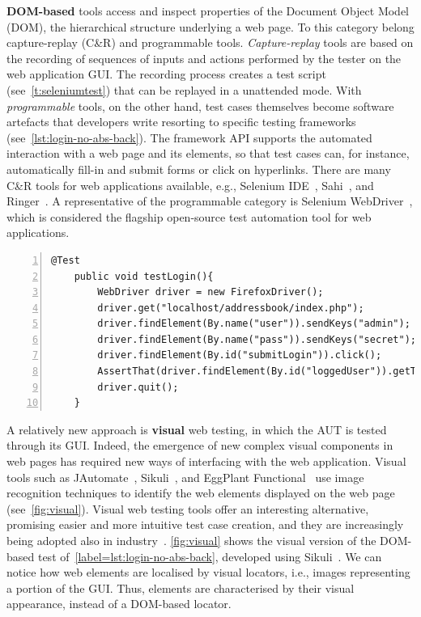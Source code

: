 \textbf{DOM-based} tools access and inspect properties of the Document Object Model (DOM), the hierarchical structure underlying a web page. To this category belong capture-replay (C\&R) and programmable tools. \textit{Capture-replay} tools are based on the recording of sequences of inputs and actions performed by the tester on the web application GUI. The recording process creates a test script (see~\autoref{t:seleniumtest}) that can be replayed in a unattended mode. 
With \textit{programmable} tools, on the other hand, test cases themselves become software artefacts that developers write 
resorting to specific testing frameworks (see~\autoref{lst:login-no-abs-back}). The framework API supports the automated interaction with a web page and its elements, so that test cases can, for instance, automatically fill-in and submit forms or click on hyperlinks. There are many C\&R tools for web applications available, e.g., Selenium IDE~\cite{selenium}, Sahi~\cite{sahi}, and Ringer~\cite{ringer}. A representative of the programmable category is Selenium WebDriver~\cite{selenium}, which is considered the flagship open-source test automation tool for web applications.

\begin{lstlisting}[firstnumber=1, xleftmargin=6ex, float=t,numbers=left,caption={An example of programmable automated test (Selenium WebDriver)},label=lst:login-no-abs-back]
	@Test
	public void testLogin(){
		WebDriver driver = new FirefoxDriver();
		driver.get("localhost/addressbook/index.php");
		driver.findElement(By.name("user")).sendKeys("admin");
		driver.findElement(By.name("pass")).sendKeys("secret");
		driver.findElement(By.id("submitLogin")).click();
		AssertThat(driver.findElement(By.id("loggedUser")).getText(), is("(admin)"));
		driver.quit();
	}
\end{lstlisting}

A relatively new approach is \textbf{visual} web testing, in which the AUT is tested through its GUI. Indeed, the emergence of new complex visual components in web pages has required new ways of interfacing with the web application. Visual tools such as JAutomate~\cite{Alegroth2013jat}, Sikuli~\cite{Sikuli}, and EggPlant Functional~\cite{eggplant} use image recognition techniques to identify the web elements displayed on the web page (see~\autoref{fig:visual}). Visual web testing tools offer an interesting alternative, promising easier and more intuitive test case creation, and they are increasingly being adopted also in industry~\cite{Alegroth2013jat}. 
\autoref{fig:visual} shows the visual version of the DOM-based test of~\autoref{label=lst:login-no-abs-back}, developed using Sikuli~\cite{Sikuli}. We can notice how web elements are localised by visual locators, i.e., images representing a portion of the GUI. Thus, elements are characterised by their visual appearance, instead of a DOM-based locator.

